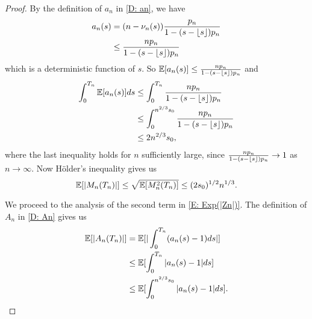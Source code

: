 \begin{proof}
    By the definition of $a_n$ in \eqref{D: an}, we have
    \begin{equation}
    \begin{aligned}
    a_n(s) &= (n - \nu_n(s)) \frac{p_n}{1 - (s - \lfloor s\rfloor)p_n} \\
    &\leq \frac{n p_n}{1 - (s - \lfloor s\rfloor)p_n}
    \end{aligned}
    \end{equation}
    which is a deterministic function of $s$. So
    $ \mathbb{E}[a_n(s)] \leq \frac{n p_n}{1 - (s - \lfloor s\rfloor)p_n} $
    and
    \begin{equation}
    \begin{aligned}
    \int_{0}^{T_n} \mathbb{E}[a_n(s)] ds &\leq  \int_{0}^{T_n }\frac{n p_n}{1 - (s - \lfloor s\rfloor)p_n} \\
    &\leq \int_{0}^{n^{2 / 3}s_0}\frac{n p_n}{1 - (s - \lfloor s\rfloor)p_n} \\
    &\leq 2n^{2 / 3}s_0,
    \end{aligned}
    \end{equation}
    where the last inequality holds for $n$ sufficiently large, since 
    $\frac{n p_n}{1 - (s - \lfloor s\rfloor)p_n} \rightarrow 1$
    as $n \rightarrow \infty$.
    Now H\"older's inequality gives us
    \begin{equation} \label{E: Exp(Mn)}
    \mathbb{E}[|M_n(T_n)|] \leq \sqrt{\mathbb{E}[M^2_n(T_n)]} \leq (2s_0)^{1/2}n^{1 / 3}.
    \end{equation}
    
    We proceed to the analysis of the second term in \eqref{E: Exp(|Zn|)}.
    The definition of $A_n$ in \eqref{D: An} gives us
    \begin{equation}
    \begin{aligned}
    \mathbb{E}[|A_n(T_n)|] 
    &= \mathbb{E}[|\int_{0}^{T_n}(a_n(s) -1)ds |] \\
    &\leq \mathbb{E}[\int_{0}^{T_n} |a_n(s)-1|ds] \\
    &\leq \mathbb{E}[\int_{0}^{n^{2 / 3}s_0} |a_n(s)-1|ds].
    \end{aligned}
    \end{equation}
    

\end{proof}
